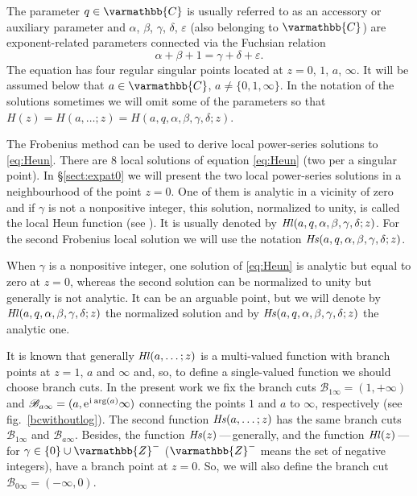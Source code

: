 \documentclass[11pt]{article}
\newcommand{\MF}[1]{\mathop{#1}\nolimits}
\newcommand{\ii}{\kern0.05em\mathrm{i}\kern0.05em} \newcommand{\E}[1]{\textrm{e}^{#1}}
\newcommand{\Zz}{\varmathbb{Z}}%
\newcommand{\Cb}{\varmathbb{C}}%
\newcommand{\BCzero}{\mathscr{B}_{0\infty}}%
\newcommand{\BCone}{\mathscr{B}_{1\infty}}%
\newcommand{\BCa}{\mathscr{B}_{a\infty}}
\def\Heun{H}%
\def\HeunL{\MF{\textit{Hl\/}}}%
\def\HeunS{\MF{\textit{Hs\/}}}%
\begin{document}
The parameter $q\in\Cb$ is usually referred to as an accessory or
auxiliary parameter and $\alpha$, $\beta$, $\gamma$, $\delta$, $\varepsilon$
(also belonging to $\Cb$) are exponent-related parameters connected via the
Fuchsian relation
\begin{equation*}
\alpha+\beta+1=\gamma+\delta+\varepsilon.
\end{equation*}
The equation has four regular singular points located at $z=0$, $1$, $a$,
$\infty$. It will be assumed below that $a \in\Cb$, $a\neq\{0,1,\infty\}$. In
the notation of the solutions sometimes we will omit some of the parameters so
that $\Heun(z)=\Heun(a,\ldots;z)=\Heun(a,q,\alpha,\beta,\gamma,\delta;z)$.

The Frobenius method can be used to derive local power-series solutions to
\eqref{eq:Heun}. There are $8$ local solutions of equation \eqref{eq:Heun} (two
per a singular point). In \S\;\ref{sect:expat0} we will present the two local
power-series solutions in a neighbourhood of the point $z = 0$. One of them is
analytic in a vicinity of zero and if $\gamma$ is not a nonpositive integer,
this solution, normalized to unity, is called the local Heun function (see
\cite{Ronveaux1995}). It is usually denoted by
$\HeunL(a,q,\alpha,\beta,\gamma,\delta;z)$. For the second Frobenius local
solution we will use the notation $\HeunS(a,q,\alpha,\beta,\gamma,\delta;z)$.

When $\gamma$ is a nonpositive integer, one solution of \eqref{eq:Heun} is
analytic but equal to zero at $z=0$, whereas the second solution can be
normalized to unity but generally is not analytic. It can be an arguable point,
but we will denote by $\HeunL(a,q,\alpha,\beta,\gamma,\delta;z)$ the normalized
solution and by $\HeunS(a,q,\alpha,\beta,\gamma,\delta;z)$ the analytic one.

It is known that generally $\HeunL(a,\ldots;z)$ is a multi-valued function with
branch points at $z=1$, $a$ and $\infty$ and, so, to define a single-valued
function we should choose branch cuts. In the present work we fix the branch
cuts $\BCone=(1,+\infty)$ and $\BCa=(a,\E{\ii\arg(a)}\infty)$ connecting the
points $1$ and $a$ to $\infty$, respectively (see fig.~\ref{bcwithoutlog}). The
second function $\HeunS(a,\ldots;z)$ has the same branch cuts $\BCone$ and
$\BCa$. Besides, the function $\HeunS(z)$\,---\,generally, and the function
$\HeunL(z)$\,---\,for $\gamma\in\{0\}\cup\Zz^-$ ($\Zz^-$ means the set of
negative integers), have a branch point at $z=0$. So, we will also define the
branch cut $\BCzero=(-\infty,0)$.
\end{document}
